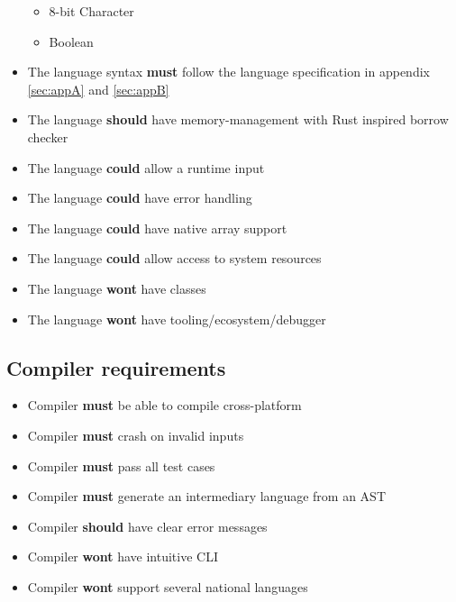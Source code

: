 \begin{itemize}
\begin{itemize}
\item 8-bit Character
\item Boolean
\end{itemize}
\item The language syntax \textbf{must} follow the language specification in appendix
  \ref{sec:appA} and \ref{sec:appB}
\item The language \textbf{should} have memory-management with Rust inspired borrow checker
\item The language \textbf{could} allow a runtime input
\item The language \textbf{could} have error handling
\item The language \textbf{could} have native array support
\item The language \textbf{could} allow access to system resources
\item The language \textbf{wont} have classes
\item The language \textbf{wont} have tooling/ecosystem/debugger
\end{itemize}

\subsection{Compiler requirements} %

\begin{itemize}
\item Compiler \textbf{must} be able to compile cross-platform
\item Compiler \textbf{must} crash on invalid inputs
\item Compiler \textbf{must} pass all test cases
\item Compiler \textbf{must} generate an intermediary language from an AST
\item Compiler \textbf{should} have clear error messages
\item Compiler \textbf{wont} have intuitive CLI
\item Compiler \textbf{wont} support several national languages
\end{itemize}

\newpage
